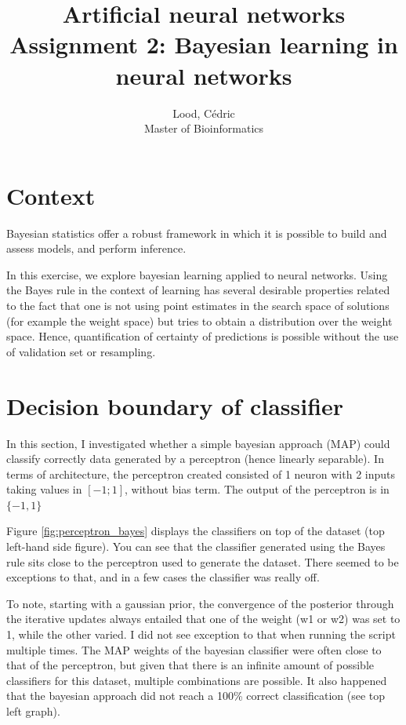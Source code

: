 \documentclass[11pt, a4paper]{article}
\title{ \huge Artificial neural networks \\ 
  { \large Assignment 2: Bayesian learning in neural networks }}
\author{
        Lood, Cédric \\
        \small Master of Bioinformatics
}
\begin{document}
\maketitle

\section{Context}
Bayesian statistics offer a robust framework in which it is possible
to build and assess models, and perform inference. 

In this exercise, we explore bayesian learning applied to neural
networks. Using the Bayes rule in the context of learning has several
desirable properties related to the fact that one is not using point
estimates in the search space of solutions (for example the weight
space) but tries to obtain a distribution over the weight
space. Hence, quantification of certainty of predictions is possible
without the use of validation set or resampling.

\section{Decision boundary of classifier}

In this section, I investigated whether a simple bayesian approach
(MAP) could classify correctly data generated by a perceptron (hence
linearly separable). In terms of architecture, the perceptron created
consisted of 1 neuron with 2 inputs taking values in $[-1; 1]$,
without bias term. The output of the perceptron is in $\{-1, 1\}$

Figure \ref{fig:perceptron_bayes} displays the classifiers on top of
the dataset (top left-hand side figure). You can see that the
classifier generated using the Bayes rule sits close to the perceptron
used to generate the dataset. There seemed to be exceptions to that,
and in a few cases the classifier was really off.

To note, starting with a gaussian prior, the convergence of the
posterior through the iterative updates always entailed that one of
the weight (w1 or w2) was set to 1, while the other varied. I did not
see exception to that when running the script multiple times. The MAP
weights of the bayesian classifier were often close to that of the
perceptron, but given that there is an infinite amount of possible
classifiers for this dataset, multiple combinations are possible. It
also happened that the bayesian approach did not reach a 100\% correct
classification (see top left graph).
\end{document}
